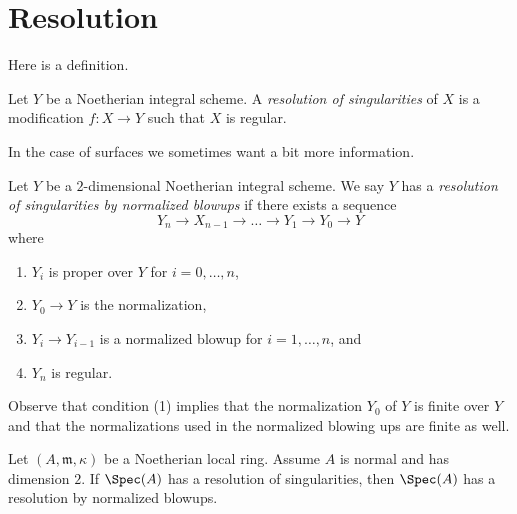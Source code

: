 










\section{Resolution}
\label{section-resolution}



\noindent
Here is a definition.

\begin{definition}
\label{definition-resolution}
Let $Y$ be a Noetherian integral scheme. A {\it resolution of singularities}
of $X$ is a modification $f : X \to Y$ such that $X$ is regular.
\end{definition}

\noindent
In the case of surfaces we sometimes want a bit more information.

\begin{definition}
\label{definition-resolution-surface}
Let $Y$ be a $2$-dimensional Noetherian integral scheme.
We say $Y$ has a {\it resolution of singularities by normalized blowups}
if there exists a sequence
$$
Y_n \to X_{n - 1} \to \ldots \to Y_1 \to Y_0 \to Y
$$
where
\begin{enumerate}
\item $Y_i$ is proper over $Y$ for $i = 0, \ldots, n$,
\item $Y_0 \to Y$ is the normalization,
\item $Y_i \to Y_{i - 1}$ is a normalized blowup for $i = 1, \ldots, n$, and
\item $Y_n$ is regular.
\end{enumerate}
\end{definition}

\noindent
Observe that condition (1) implies that the normalization
$Y_0$ of $Y$ is finite over $Y$ and that the normalizations
used in the normalized blowing ups are finite as well.

\begin{lemma}
\label{lemma-existence-implies-existence-by-normalized-blowing-ups}
Let $(A, \mathfrak m, \kappa)$ be a Noetherian local ring.
Assume $A$ is normal and has dimension $2$.
If $\Spec(A)$ has a resolution of singularities,
then $\Spec(A)$ has a resolution by normalized blowups.
\end{lemma}

